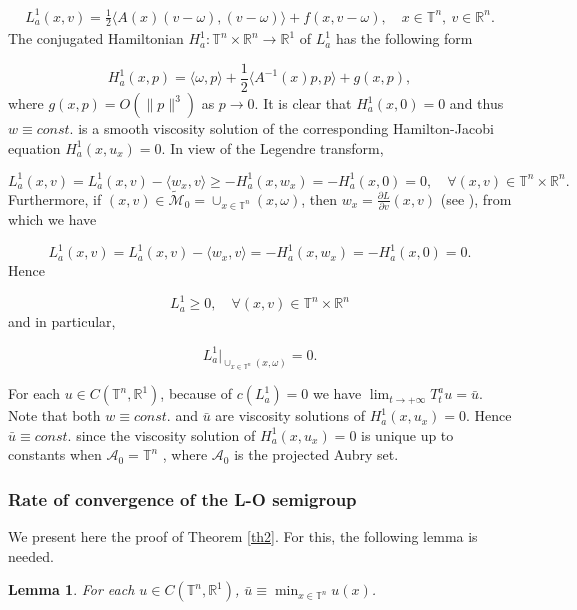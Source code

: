\documentclass{amsart}[12pt]
\newtheorem{lemma}[theorem]{Lemma}
\theoremstyle{definition}
\theoremstyle{remark}
\numberwithin{equation}{section}
\begin{document}
\begin{align*}
L^1_a(x,v)=\frac{1}{2}\langle
A(x)(v-\omega),(v-\omega)\rangle+f(x,v-\omega), \quad x\in
\mathbb{T}^n,\ v\in\mathbb{R}^n.
\end{align*}
The conjugated Hamiltonian
$H^1_a:\mathbb{T}^n\times\mathbb{R}^n\rightarrow\mathbb{R}^1$ of
$L_a^1$ has the following form

\[
H^1_a(x,p)=\langle\omega,p\rangle+\frac{1}{2}\langle
A^{-1}(x)p,p\rangle+g(x,p),
\]
where $g(x,p)=O(\|p\|^3)$ as $p\rightarrow 0$. It is clear that
$H^1_a(x,0)=0$ and thus $w\equiv const.$ is a smooth viscosity
solution of the corresponding Hamilton-Jacobi equation
$H^1_a(x,u_x)=0$. In view of the Legendre transform,

\[
L^1_a(x,v)=L^1_a(x,v)-\langle
w_x,v\rangle\geq-H^1_a(x,w_x)=-H^1_a(x,0)=0, \quad \forall
(x,v)\in\mathbb{T}^n\times\mathbb{R}^n.
\]
Furthermore, if
$(x,v)\in\tilde{\mathcal{M}}_0=\cup_{x\in\mathbb{T}^n}(x,\omega)$,
then $w_x=\frac{\partial L}{\partial v}(x,v)$ (see \cite[Theorem 4.8.3]{Fat-b}),
from which we have

\[
L^1_a(x,v)=L^1_a(x,v)-\langle
w_x,v\rangle=-H^1_a(x,w_x)=-H^1_a(x,0)=0.
\]
Hence

\[
L^1_a\geq 0, \quad \forall (x,v)\in\mathbb{T}^n\times\mathbb{R}^n
\]
and in particular,

\[
L^1_a|_{\cup_{x\in\mathbb{T}^n}(x,\omega)}=0.
\]

For each $u\in C(\mathbb{T}^n,\mathbb{R}^1)$, because of
$c(L^1_a)=0$ we have $\lim_{t\rightarrow+\infty}T_t^au=\bar{u}$.
Note that both $w\equiv const.$ and $\bar{u}$ are  viscosity
solutions of $H^1_a(x,u_x)=0$. Hence $\bar{u}\equiv const.$ since
the viscosity solution of $H^1_a(x,u_x)=0$ is unique up to
constants when $\mathcal{A}_0=\mathbb{T}^n$ \cite{Lia}, where
$\mathcal{A}_0$ is the projected Aubry set.

\subsubsection{Rate of convergence of the L-O semigroup}
We present here the proof of Theorem \ref{th2}. For this, the
following lemma is needed.

\begin{lemma}\label{le4-1}
For each $u\in C(\mathbb{T}^n,\mathbb{R}^1)$,
$\bar{u}\equiv\min_{x\in\mathbb{T}^n}u(x)$.
\end{lemma}
\end{document}
